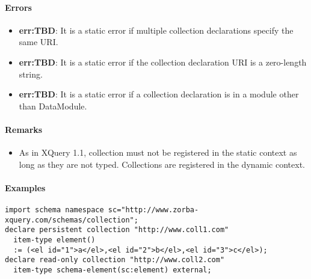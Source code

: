 \documentclass[]{article}
\begin{document}
\vspace{0.5cm}

\paragraph{Errors}
\begin{itemize}
  \item \textbf{err:TBD}: It is a static error if multiple collection declarations specify the same URI.
  \item \textbf{err:TBD}: It is a static error if the collection declaration URI is a zero-length string.
  \item \textbf{err:TBD}: It is a static error if a collection declaration is in a module other than DataModule.
\end{itemize}

\paragraph{Remarks}
\begin{itemize}
  \item As in XQuery 1.1, collection must not be registered in the static context as long as they are not typed. Collections are registered in the dynamic context.
\end{itemize}

\paragraph{Examples}
\begin{verbatim}
import schema namespace sc="http://www.zorba-xquery.com/schemas/collection";
declare persistent collection "http://www.coll1.com" 
  item-type element() 
  := (<el id="1">a</el>,<el id="2">b</el>,<el id="3">c</el>);
declare read-only collection "http://www.coll2.com" 
  item-type schema-element(sc:element) external;
\end{verbatim}
\end{document}
